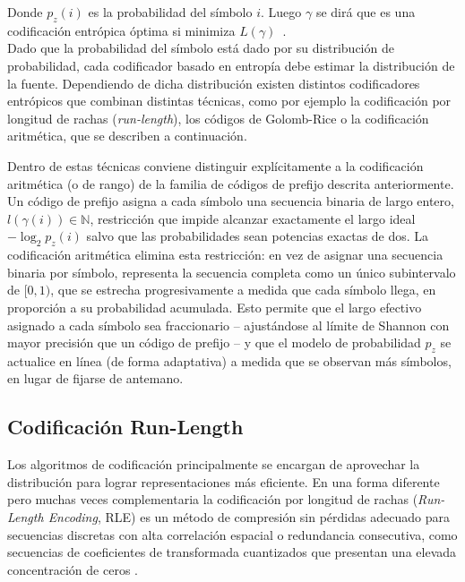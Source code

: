 	Donde $p_z (i)$ es la probabilidad del símbolo $i$. Luego $\gamma$ se dirá que es una codificación entrópica óptima si minimiza $L(\gamma)$~\cite{goyal2001theoretical}.\\

        Dado que la probabilidad del símbolo está dado por su distribución de probabilidad, cada codificador basado en entropía debe estimar la distribución de la fuente. Dependiendo de dicha distribución existen distintos codificadores entrópicos que combinan distintas técnicas, como por ejemplo la codificación por longitud de rachas (\textit{run-length}), los códigos de Golomb-Rice o la codificación aritmética, que se describen a continuación.

Dentro de estas técnicas conviene distinguir explícitamente a la codificación aritmética (o de
rango) de la familia de códigos de prefijo descrita anteriormente. Un código de prefijo asigna a
cada símbolo una secuencia binaria de largo entero, $l(\gamma(i)) \in \mathbb{N}$, restricción
que impide alcanzar exactamente el largo ideal $-\log_2 p_z(i)$ salvo que las probabilidades
sean potencias exactas de dos. La codificación aritmética elimina esta restricción: en vez de
asignar una secuencia binaria por símbolo, representa la secuencia completa como un único
subintervalo de $[0,1)$, que se estrecha progresivamente a medida que cada símbolo llega, en
proporción a su probabilidad acumulada. Esto permite que el largo efectivo asignado a cada
símbolo sea fraccionario -- ajustándose al límite de Shannon con mayor precisión que un código
de prefijo -- y que el modelo de probabilidad $p_z$ se actualice en línea (de forma adaptativa)
a medida que se observan más símbolos, en lugar de fijarse de antemano.

\subsection{Codificación Run-Length}
Los algoritmos de codificación principalmente se encargan de aprovechar la distribución para lograr representaciones más eficiente. En una forma diferente pero muchas veces complementaria la codificación por longitud de rachas (\textit{Run-Length Encoding}, RLE) es un método de compresión sin pérdidas adecuado para secuencias discretas con alta correlación espacial o redundancia consecutiva, como secuencias de coeficientes de transformada cuantizados que presentan una elevada concentración de ceros \cite{ortega1998rate, malvar2006adaptive}.

